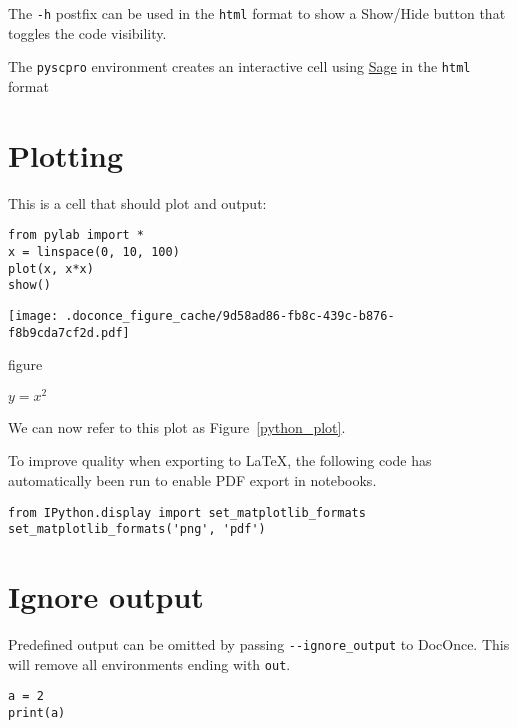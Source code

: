 \documentclass[%
oneside,                 %
final,                   %
chapterprefix=true,      %
open=right,              %
10pt]{book}
\begin{document}
The \texttt{-h} postfix can be used in the \texttt{html} format to show a Show/Hide button that toggles the code visibility.

The \texttt{pyscpro} environment creates an interactive cell using \href{{https://github.com/sagemath/sagecell/}}{Sage} in the \texttt{html} format

\section{Plotting}

This is a cell that should plot and output:






\begin{Verbatim}[numbers=none,fontsize=\fontsize{9pt}{9pt},baselinestretch=0.95]
from pylab import *
x = linspace(0, 10, 100)
plot(x, x*x)
show()

\end{Verbatim}

\begin{center}
   \texttt{[image: .doconce\_figure\_cache/9d58ad86-fb8c-439c-b876-f8b9cda7cf2d.pdf]}
   \caption{figure}{$y=x^2$}
   \label{python_plot}
\end{center}




We can now refer to this plot as Figure~\ref{python_plot}.

To improve quality when exporting to {\LaTeX}, the following code has automatically
been run to enable PDF export in notebooks.




\begin{Verbatim}[numbers=none,fontsize=\fontsize{9pt}{9pt},baselinestretch=0.95]
from IPython.display import set_matplotlib_formats
set_matplotlib_formats('png', 'pdf')

\end{Verbatim}


\section{Ignore output}

Predefined output can be omitted by passing \Verb!--ignore_output! to DocOnce.
This will remove all environments ending with \texttt{out}.




\begin{Verbatim}[numbers=none,fontsize=\fontsize{9pt}{9pt},baselinestretch=0.95]
a = 2
print(a)

\end{Verbatim}
\end{document}
